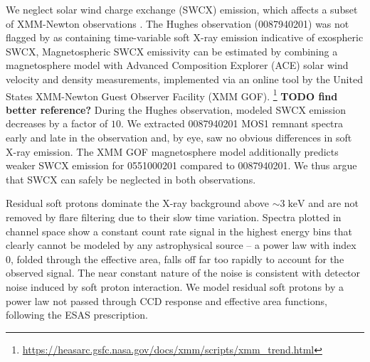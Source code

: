 \documentclass[preprint2,tighten,trackchanges]{aastex6}
\newcommand*{\mt}{\mathrm}
\newcommand*{\unit}[1]{\;\mt{#1}}  %
\begin{document}
We neglect solar wind charge exchange (SWCX) emission, which affects a subset
of XMM-Newton observations \citep{snowden2004}.
The Hughes observation (0087940201) was not flagged by \citet{carter2011} as
containing time-variable soft X-ray emission indicative of exospheric SWCX,
Magnetospheric SWCX emissivity can be estimated by combining a magnetosphere
model \citep{spreiter1966} with Advanced Composition Explorer (ACE) solar wind
velocity and density measurements, implemented via an online tool by the United
States XMM-Newton Guest Observer Facility (XMM GOF).
\footnote{\href{https://heasarc.gsfc.nasa.gov/docs/xmm/scripts/xmm_trend.html}{https://heasarc.gsfc.nasa.gov/docs/xmm/scripts/xmm\_trend.html}}
\textbf{TODO find better reference?}  %
During the Hughes observation, modeled SWCX emission decreases by a
factor of $10$.
We extracted 0087940201 MOS1 remnant spectra early and late in the observation
and, by eye, saw no obvious differences in soft X-ray emission.
The XMM GOF magnetosphere model additionally predicts weaker SWCX emission for
0551000201 compared to 0087940201.
We thus argue that SWCX can safely be neglected in both observations.


Residual soft protons dominate the X-ray background above $\sim 3 \unit{keV}$
and are not removed by flare filtering due to their slow time variation.
Spectra plotted in channel space show a constant count rate signal in the
highest energy bins that clearly cannot be modeled by any astrophysical source
-- a power law with index 0, folded through the effective area, falls off far
too rapidly to account for the observed signal.
The near constant nature of the noise is consistent with detector noise induced
by soft proton interaction.
We model residual soft protons by a power law not passed through CCD response
and effective area functions, following the ESAS prescription.


\end{document}
